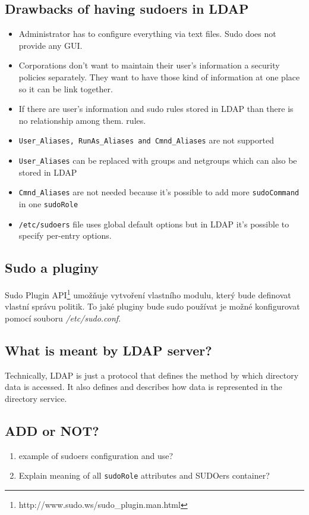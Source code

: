 \documentclass[12pt,a4paper,titlepage,final]{article}
\begin{document}
\subsection{Drawbacks of having sudoers in LDAP}\label{sec:sudo_ldap_drawbacks}
\begin{itemize} 
	\item Administrator has to configure everything via text files. Sudo does not
		provide any GUI.
	\item Corporations don't want to maintain their user's information a security
		policies separately. They want to have those kind of information at one place
		so it can be link together.
	\item If there are user's information and sudo rules stored in LDAP than there
		is no relationship among them.
		rules.
	\item \texttt{User\_Aliases, RunAs\_Aliases and Cmnd\_Aliases} are not supported
	\item \texttt{User\_Aliases} can be replaced with groups and netgroups which can
		also be stored in LDAP
	\item \texttt{Cmnd\_Aliases} are not needed because it's possible to add more
		\texttt{sudoCommand} in one \texttt{sudoRole}
	\item \texttt{/etc/sudoers} file uses global default options but in LDAP it's
		possible to specify per-entry options.
\end{itemize}

\subsection{Sudo a pluginy}
Sudo Plugin API\footnote{http://www.sudo.ws/sudo\_plugin.man.html}
umožňuje vytvoření vlastního modulu, který bude definovat vlastní správu
politik.  To jaké pluginy bude sudo používat je možné konfigurovat pomocí
souboru \textit{/etc/sudo.conf}.

\subsection{What is meant by LDAP server?}
Technically, LDAP is just a protocol that defines the method by which directory
data is accessed. It also defines and describes how data is represented in the
directory service.

{\color{blue}
\subsection{ADD or NOT?}
\begin{enumerate} 
	\item example of sudoers configuration and use?
	\item Explain meaning of all \texttt{sudoRole} attributes and SUDOers container?
\end{enumerate} 
}
\end{document}
